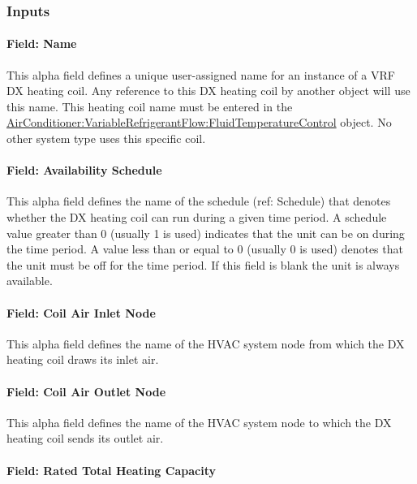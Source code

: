 \subsubsection{Inputs}\label{inputs-9-007}

\paragraph{Field: Name}\label{field-name-8-006}

This alpha field defines a unique user-assigned name for an instance of a VRF DX heating coil. Any reference to this DX heating coil by another object will use this name. This heating coil name must be entered in the \hyperref[airconditionervariablerefrigerantflowfluidtemperaturecontrol]{AirConditioner:VariableRefrigerantFlow:FluidTemperatureControl} object. No other system type uses this specific coil.

\paragraph{Field: Availability Schedule}\label{field-availability-schedule}

This alpha field defines the name of the schedule (ref: Schedule) that denotes whether the DX heating coil can run during a given time period. A schedule value greater than 0 (usually 1 is used) indicates that the unit can be on during the time period. A value less than or equal to 0 (usually 0 is used) denotes that the unit must be off for the time period. If this field is blank the unit is always available.

\paragraph{Field: Coil Air Inlet Node}\label{field-coil-air-inlet-node-2}

This alpha field defines the name of the HVAC system node from which the DX heating coil draws its inlet air.

\paragraph{Field: Coil Air Outlet Node}\label{field-coil-air-outlet-node-2}

This alpha field defines the name of the HVAC system node to which the DX heating coil sends its outlet air.

\paragraph{Field: Rated Total Heating Capacity}\label{field-rated-total-heating-capacity}

